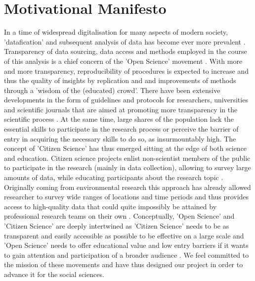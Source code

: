 \documentclass[preprint,12pt,authoryear]{elsarticle}
\begin{document}
	\section{Motivational Manifesto}
	In a time of widespread digitalisation for many aspects of modern society, 'datafication' and subsequent analysis of data has become ever more prevalent \citep{baack_datafication_2015, lycett_datafication:_2013}. Transparency of data sourcing, data access and methods employed in the course of this analysis is a chief concern of the 'Open Science' movement \citep{delfanti_open_2010}. With more and more transparency, reproducibility of procedures is expected to increase and thus the quality of insights by replication and and improvements of methods through a 'wisdom of the (educated) crowd'. There have been extensive developments in the form of guidelines and protocols for researchers, universities and scientific journals that are aimed at promoting more transparency in the scientific process \citep{nosek_promoting_2015, miguel_promoting_2014}. 
	At the same time, large shares of the population lack the essential skills to participate in the research process or perceive the barrier of entry in acquiring the necessary skills to do so, as insurmountably high. The concept of 'Citizen Science' has thus emerged sitting at the edge of both science and education. Citizen science projects enlist non-scientist members of the public to participate in the research (mainly in data collection), allowing to survey large amounts of data, while educating participants about the research topic \citep{shirk_public_2012}. Originally coming from environmental research this approach has already allowed researcher to survey wide ranges of locations and time periods and thus provides access to high-quality data that could quite impossibly be attained by professional research teams on their own \citep{bonney_citizen_2009}.
	Conceptually, 'Open Science' and 'Citizen Science' are deeply intertwined as 'Citizen Science' needs to be as transparent and easily accessible as possible to be effective on a large scale \citep{nov_dusting_2011} and 'Open Science' needs to offer educational value and low entry barriers if it wants to gain attention and participation of a broader audience \citep{newman_future_2012}. We feel committed to the mission of these movements and have thus designed our project in order to advance it for the social sciences. 
	
\end{document}
